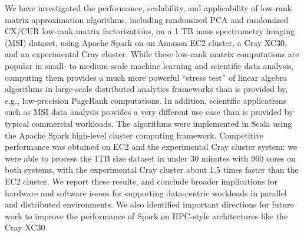 We have investigated the performance, scalability, and applicability of low-rank matrix approximation algorithms, including randomized PCA and randomized CX/CUR low-rank matrix factorizations, on a 1 TB mass spectrometry imaging (MSI) dataset, using Apache Spark on an Amazon EC2 cluster, a Cray XC30, and an experimental Cray cluster.  
While these low-rank matrix computations are popular in small- to medium-scale machine learning and scientific data analysis, computing them provides a much more powerful ``stress test'' of linear algebra algorithms in large-scale distributed analytics frameworks than is provided by, e.g., low-precision PageRank computations.
In addition, scientific applications such as MSI data analysis provides a very different use case 
than is provided by typical commercial workloads.
The algorithms were implemented in Scala using the Apache Spark high-level cluster computing framework.  
Competitive performance was obtained on EC2 and the experimental Cray cluster system: we were able to process the 1TB size dataset in under 30 minutes with 960 cores on both systems, with the experimental Cray cluster about 1.5 times faster than the EC2 cluster.  
We report these results, and conclude broader implications for hardware and software issues for supporting data-centric workloads in parallel and distributed environments.  
We also identified important directions for future work to improve the performance of Spark on HPC-style architectures like the Cray XC30.
